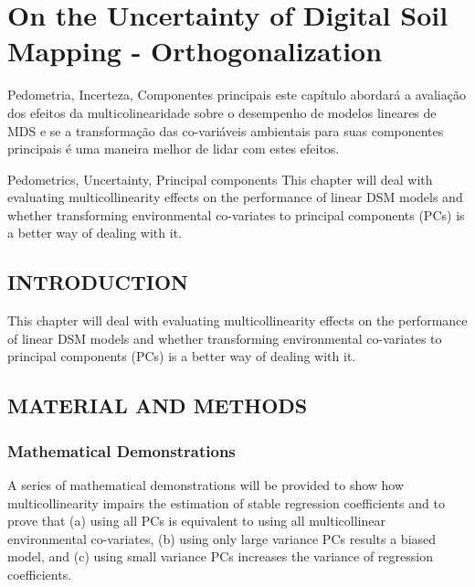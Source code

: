 \artigotrue
\chapter{On the Uncertainty of Digital Soil Mapping - Orthogonalization}
\label{chap:chapter04}

\begin{chapterabstractPOR}{Pedometria, Incerteza, Componentes principais}
este capítulo abordará a avaliação dos efeitos da multicolinearidade sobre o desempenho de modelos lineares de MDS e se a transformação das co-variáveis ambientais para suas componentes principais é uma maneira melhor de lidar com estes efeitos.
\end{chapterabstractPOR}

\begin{chapterabstractENG}{Pedometrics, Uncertainty, Principal components}
This chapter will deal with evaluating multicollinearity effects on the performance of linear DSM models and whether transforming environmental co-variates to principal components (PCs) is a better way of dealing with it.
\end{chapterabstractENG}

\section{INTRODUCTION}

This chapter will deal with evaluating multicollinearity effects on the performance of linear DSM models and whether transforming environmental co-variates to principal components (PCs) is a better way of dealing with it.

\section{MATERIAL AND METHODS}

\subsection{Mathematical Demonstrations}

A series of mathematical demonstrations will be provided to show how multicollinearity impairs the estimation of stable regression coefficients and to prove that (a) using all PCs is equivalent to using all multicollinear environmental co-variates, (b) using only large variance PCs results a biased model, and (c) using small variance PCs increases the variance of regression coefficients.

